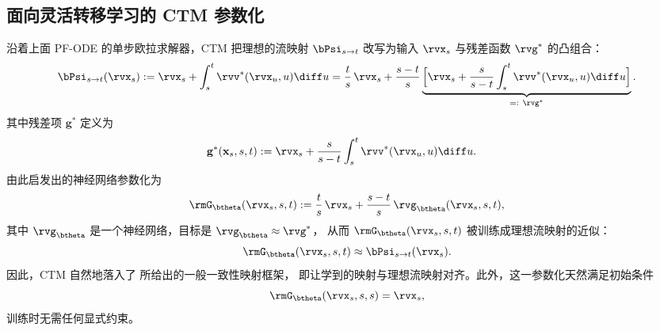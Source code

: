 \subsection{面向灵活转移学习的 CTM 参数化}
沿着上面 PF-ODE 的单步欧拉求解器，CTM 把理想的流映射 $\bPsi_{s\to t}$
改写为输入 $\rvx_s$ 与残差函数 $\rvg^*$ 的凸组合：
\begin{align*}
\bPsi_{s\to t}(\rvx_s)
:= \rvx_s + \int_s^t \rvv^*(\rvx_u,u) \diff u
= \frac{t}{s}\,\rvx_s
+ \frac{s-t}{s}
\underbrace{\Big[\rvx_s + \frac{s}{s-t} \int_s^t \rvv^*(\rvx_u,u) \diff u\Big]}_{=:~\rvg^*}.
\end{align*}
其中残差项 $\mathbf{g}^*$ 定义为
\begin{align}\label{eq:ctm-g-oracle}
\mathbf{g}^*(\mathbf{x}_{s}, s, t) &:= \rvx_s + \frac{s}{s-t} \int_s^t \rvv^*(\rvx_u,u)\diff u.
\end{align}
由此启发出的神经网络参数化为
\begin{align}\label{eq:ctm_para_1}
    \rmG_{\btheta}(\rvx_s,s,t)
:= \frac{t}{s}\,\rvx_s + \frac{s-t}{s}\,\rvg_{\btheta}(\rvx_s,s,t),
\end{align}
其中 $\rvg_{\btheta}$ 是一个神经网络，目标是 $\rvg_{\btheta} \approx \rvg^*$，
从而 $\rmG_{\btheta}(\rvx_s,s,t)$ 被训练成理想流映射的近似：
\[
\rmG_{\btheta}(\rvx_s,s,t) \approx \bPsi_{s\to t}(\rvx_s).
\]
因此，CTM 自然地落入了  所给出的一般一致性映射框架，
即让学到的映射与理想流映射对齐。此外，这一参数化天然满足初始条件
\[
\rmG_{\btheta}(\rvx_s,s,s)=\rvx_s,
\]
训练时无需任何显式约束。


